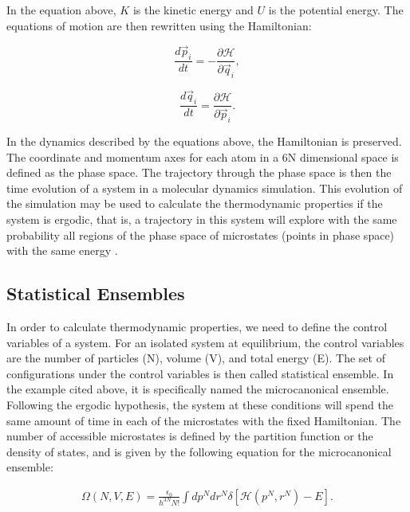 In the equation above, $K$ is the kinetic energy and $U$ is the potential energy. The equations of motion are then rewritten using the Hamiltonian:

\begin{equation}
\frac{d \vec{p}_{i}}{dt} = - \frac{\partial \mathcal{H}}{\partial \vec{q}_{i}},
\end{equation}

\begin{equation}
\frac{d \vec{q}_{i}}{dt} =  \frac{\partial \mathcal{H}}{\partial \vec{p}_{i}}.
\end{equation}

In the dynamics described by the equations above, the Hamiltonian is preserved. The coordinate and momentum axes for each atom in a 6N dimensional space is defined as the phase space. The trajectory through the phase space is then the time evolution of a system in a molecular dynamics simulation. This evolution of the simulation may be used to calculate the thermodynamic properties if the system is ergodic, that is, a trajectory in this system will explore with the same probability all regions of the phase space of microstates (points in phase space) with the same energy \cite{shell2015}. 

\subsection{Statistical Ensembles}

In order to calculate thermodynamic properties, we need to define the control variables of a system. For an isolated system at equilibrium, the control variables are the number of particles (N), volume (V), and total energy (E). The set of configurations under the control variables is then called statistical ensemble. In the example cited above, it is specifically named the microcanonical ensemble. Following the ergodic hypothesis, the system at these conditions will spend the same amount of time in each of the microstates  with the fixed Hamiltonian.  The number of accessible microstates is defined by the partition function or the density of states, and  is given by the following equation  for the microcanonical ensemble: 

\begin{equation}
\begin{aligned}
\Omega (N,V,E) = \frac{\epsilon_{0}}{h^{3N}N!} \int dp^{N} dr^{N} \delta [\mathcal{H}(p^{N},r^{N}) -E].
\end{aligned}
\end{equation}

